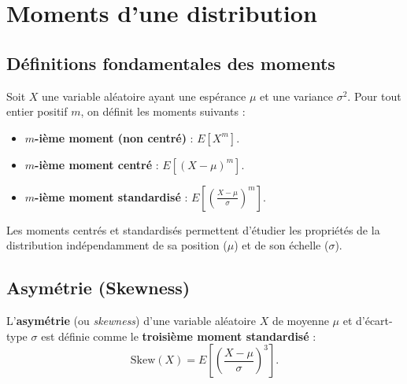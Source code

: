 \newpage

\section{Moments d'une distribution}

\subsection{Définitions fondamentales des moments}

\begin{definitionbox}
Soit $X$ une variable aléatoire ayant une espérance $\mu$ et une variance $\sigma^2$. Pour tout entier positif $m$, on définit les moments suivants :
\begin{itemize}
    \item \textbf{$m$-ième moment (non centré)} : $E[X^m]$.
    \item \textbf{$m$-ième moment centré} : $E[(X - \mu)^m]$.
    \item \textbf{$m$-ième moment standardisé} : $E\left[\left(\frac{X - \mu}{\sigma}\right)^m\right]$.
\end{itemize}
Les moments centrés et standardisés permettent d'étudier les propriétés de la distribution indépendamment de sa position ($\mu$) et de son échelle ($\sigma$).
\end{definitionbox}

\subsection{Asymétrie (Skewness)}

\begin{definitionbox}
L'\textbf{asymétrie} (ou \textit{skewness}) d'une variable aléatoire $X$ de moyenne $\mu$ et d'écart-type $\sigma$ est définie comme le \textbf{troisième moment standardisé} :
$$ \text{Skew}(X) = E\left[ \left( \frac{X - \mu}{\sigma} \right)^3 \right]. $$
\end{definitionbox}

